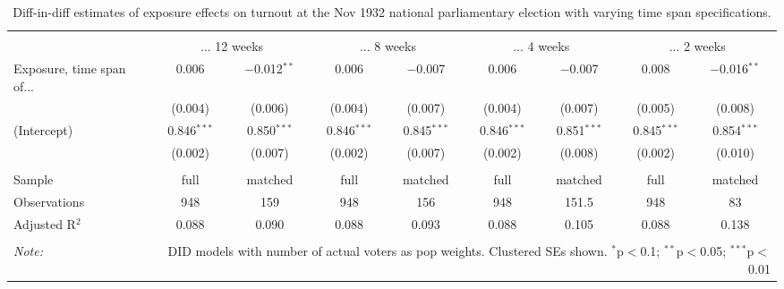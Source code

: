 
\begin{table}[!htbp] \centering 
  \caption{Diff-in-diff estimates of exposure effects on turnout at the Nov 1932 national parliamentary election with varying time span specifications.\vspace{-.25cm}} 
  \label{tab:turnout-timespan-dd-1932-2} 
\scriptsize 
\begin{tabular}{@{\extracolsep{5pt}}lcccccccc} 
\\[-1.8ex]\hline 
\hline \\[-1.8ex] 
 & \multicolumn{2}{c}{... 12 weeks} & \multicolumn{2}{c}{... 8 weeks} & \multicolumn{2}{c}{... 4 weeks} & \multicolumn{2}{c}{... 2 weeks} \\ 
 \cmidrule(r){2-3}\cmidrule(r){4-5}\cmidrule(r){6-7}\cmidrule(r){8-9}Exposure, time span of... & 0.006 & $-$0.012$^{**}$ & 0.006 & $-$0.007 & 0.006 & $-$0.007 & 0.008 & $-$0.016$^{**}$ \\ 
  & (0.004) & (0.006) & (0.004) & (0.007) & (0.004) & (0.007) & (0.005) & (0.008) \\ 
  (Intercept) & 0.846$^{***}$ & 0.850$^{***}$ & 0.846$^{***}$ & 0.845$^{***}$ & 0.846$^{***}$ & 0.851$^{***}$ & 0.845$^{***}$ & 0.854$^{***}$ \\ 
  & (0.002) & (0.007) & (0.002) & (0.007) & (0.002) & (0.008) & (0.002) & (0.010) \\ 
 \hline \\[-1.8ex] 
Sample & full & matched & full & matched & full & matched & full & matched \\ 
Observations & 948 & 159 & 948 & 156 & 948 & 151.5 & 948 & 83 \\ 
Adjusted R$^{2}$ & 0.088 & 0.090 & 0.088 & 0.093 & 0.088 & 0.105 & 0.088 & 0.138 \\ 
\hline 
\hline \\[-1.8ex] 
\textit{Note:}  & \multicolumn{8}{r}{DID models with number of actual voters as pop weights. Clustered SEs shown. $^{*}$p$<$0.1; $^{**}$p$<$0.05; $^{***}$p$<$0.01} \\ 
\end{tabular} 
\end{table} 
